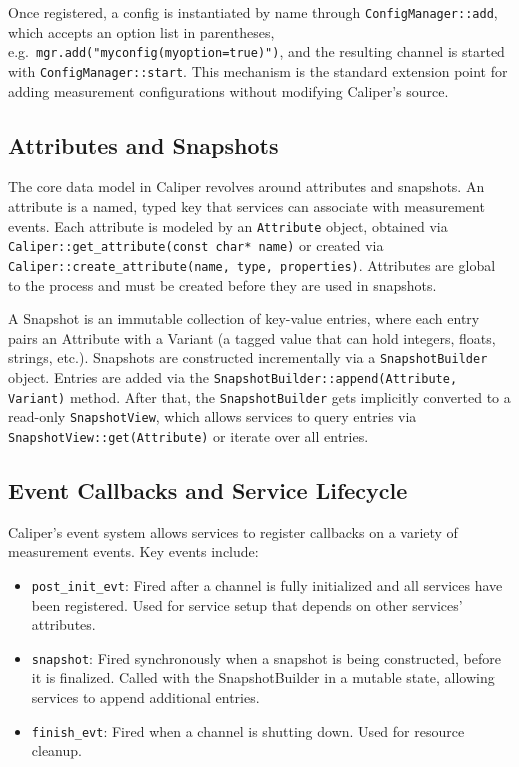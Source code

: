 Once registered, a config is instantiated by name through \texttt{ConfigManager::add}, which accepts an option list in parentheses, e.g.\ \texttt{mgr.add("myconfig(myoption=true)")}, and the resulting channel is started with \texttt{ConfigManager::start}. This mechanism is the standard extension point for adding measurement configurations without modifying Caliper's source.\cite{CaliperDocs,CaliperGh}

\subsection{Attributes and Snapshots}
\label{subsec:cali-attributes-snapshots}

The core data model in Caliper revolves around attributes and snapshots. An attribute is a named, typed key that services can associate with measurement events. Each attribute is modeled by an \texttt{Attribute} object, obtained via \texttt{Caliper::get\_attribute(const char* name)} or created via \texttt{Caliper::create\_attribute(name, type, properties)}. Attributes are global to the process and must be created before they are used in snapshots.

A Snapshot is an immutable collection of key-value entries, where each entry pairs an Attribute with a Variant (a tagged value that can hold integers, floats, strings, etc.). Snapshots are constructed incrementally via a \texttt{SnapshotBuilder} object. Entries are added via the \texttt{SnapshotBuilder::append(Attribute, Variant)} method. After that, the \texttt{SnapshotBuilder} gets implicitly converted to a read-only \texttt{SnapshotView}, which allows services to query entries via \texttt{SnapshotView::get(Attribute)} or iterate over all entries.

\subsection{Event Callbacks and Service Lifecycle}
\label{subsec:cali-events-lifecycle}

Caliper's event system allows services to register callbacks on a variety of measurement events. Key events include:
\begin{itemize}
    \item \texttt{post\_init\_evt}: Fired after a channel is fully initialized and all services have been registered. Used for service setup that depends on other services' attributes.
    \item \texttt{snapshot}: Fired synchronously when a snapshot is being constructed, before it is finalized. Called with the SnapshotBuilder in a mutable state, allowing services to append additional entries. 
    \item \texttt{finish\_evt}: Fired when a channel is shutting down. Used for resource cleanup.
\end{itemize}

